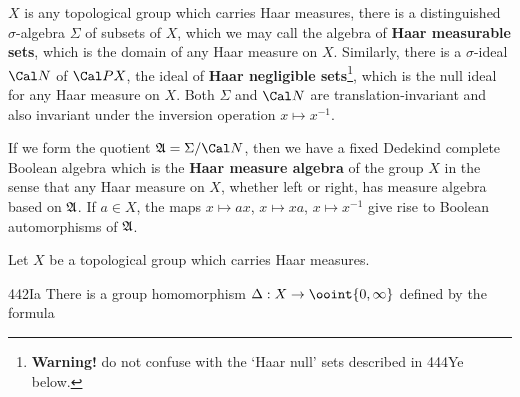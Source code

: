 


  $X$ is
any topological group which
carries Haar measures, there is a distinguished $\sigma$-algebra
$\Sigma$ of subsets of $X$, which we may call the algebra of {\bf Haar
measurable sets}, which is the domain of any Haar measure on $X$.
Similarly, there is a $\sigma$-ideal $\Cal N$ of $\Cal PX$, the ideal of
{\bf Haar negligible sets}\footnote{{\bf Warning!} do not confuse with the
`Haar null' sets described in 444Ye below.}, which is the null ideal for
any Haar measure on $X$.   Both $\Sigma$ and $\Cal N$ are
translation-invariant and also invariant under the inversion operation
$x\mapsto x^{-1}$.

If we form the quotient $\frak A=\Sigma/\Cal N$,
then we have a fixed Dedekind complete Boolean algebra which is the
{\bf Haar measure algebra} of the group $X$ in the sense that any Haar
measure on $X$, whether left or right, has measure algebra based on
$\frak A$.   If $a\in X$, the maps $x\mapsto ax$, $x\mapsto xa$,
$x\mapsto x^{-1}$ give rise to Boolean automorphisms of $\frak A$.


 Let $X$ be a topological group which
carries Haar measures.

\spheader 442Ia There is a group homomorphism
$\Delta:X\to\ooint{0,\infty}$ defined by the formula



